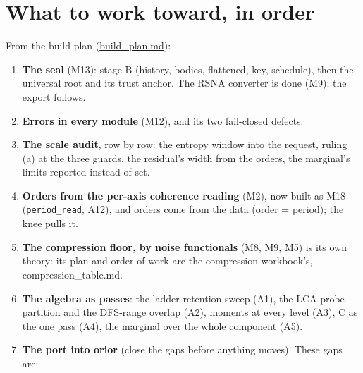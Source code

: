 \section{\texorpdfstring{What to work toward, in order}{What to work toward, in order}}

From the build plan (\hyperref[chap:build-plan]{build\_\allowbreak{}plan.md}):

\begin{enumerate}
\item \textbf{The seal} (M13): stage B (history, bodies, flattened, key, schedule), then the universal root and its trust anchor. The RSNA converter is done (M9); the export follows.
\item \textbf{Errors in every module} (M12), and its two fail-closed defects.
\item \textbf{The scale audit}, row by row: the entropy window into the request, ruling (a) at the three guards, the residual's width from the orders, the marginal's limits reported instead of set.
\item \textbf{Orders from the per-axis coherence reading} (M2), now built as M18 (\texttt{period\_\allowbreak{}read}, A12), and orders come from the data (order = period); the knee pulls it.
\item \textbf{The compression floor, by noise functionals} (M8, M9, M5) is its own theory: its plan and order of work are the compression workbook's, compression\_\allowbreak{}table.md.
\item \textbf{The algebra as passes}: the ladder-retention sweep (A1), the LCA probe partition and the DFS-range overlap (A2), moments at every level (A3), C as the one pass (A4), the marginal over the whole component (A5).
\item \textbf{The port into orior} (close the gaps before anything moves). These gaps are:


\end{enumerate}
